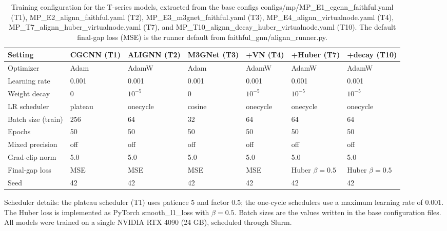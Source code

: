 \documentclass[a4paper,10pt]{article}
\begin{document}
\begin{table}[htbp]
\centering
\caption{Training configuration for the T-series models, extracted from the base configs \textnormal{configs/mp/MP\_\allowbreak E1\_\allowbreak cgcnn\_\allowbreak faithful.yaml} (T1), \textnormal{MP\_\allowbreak E2\_\allowbreak alignn\_\allowbreak faithful.yaml} (T2), \textnormal{MP\_\allowbreak E3\_\allowbreak m3gnet\_\allowbreak faithful.yaml} (T3), \textnormal{MP\_\allowbreak E4\_\allowbreak alignn\_\allowbreak virtualnode.yaml} (T4), \textnormal{MP\_\allowbreak T7\_\allowbreak alignn\_\allowbreak huber\_\allowbreak virtualnode.yaml} (T7), and \textnormal{MP\_\allowbreak T10\_\allowbreak alignn\_\allowbreak decay\_\allowbreak huber\_\allowbreak virtualnode.yaml} (T10). The default final-gap loss (MSE) is the runner default from \textnormal{faithful\_\allowbreak gnn/alignn\_\allowbreak runner.py}.}
\label{tab:train-config}
\scriptsize
\begin{tabular}{l l l l l l l}
\toprule
Setting & CGCNN (T1) & ALIGNN (T2) & M3GNet (T3) & +VN (T4) & +Huber (T7) & +decay (T10) \\
\midrule
Optimizer          & Adam    & AdamW    & Adam   & AdamW    & AdamW    & AdamW \\
Learning rate      & 0.001   & 0.001    & 0.001  & 0.001    & 0.001    & 0.001 \\
Weight decay       & 0       & \(10^{-5}\) & 0   & \(10^{-5}\) & \(10^{-5}\) & \(10^{-5}\) \\
LR scheduler       & plateau & onecycle & cosine & onecycle & onecycle & onecycle \\
Batch size (train) & 256     & 64       & 32     & 64       & 64       & 64 \\
Epochs             & 50      & 50       & 50     & 50       & 50       & 50 \\
Mixed precision    & off     & off      & off    & off      & off      & off \\
Grad-clip norm     & 5.0     & 5.0      & 5.0    & 5.0      & 5.0      & 5.0 \\
Final-gap loss     & MSE     & MSE      & MSE    & MSE      & Huber \(\beta{=}0.5\) & Huber \(\beta{=}0.5\) \\
Seed               & 42      & 42       & 42     & 42       & 42       & 42 \\
\bottomrule
\end{tabular}
\end{table}

Scheduler details: the plateau scheduler (T1) uses patience 5 and factor 0.5; the one-cycle schedulers use a maximum learning rate of 0.001. The Huber loss is implemented as PyTorch \textnormal{smooth\_l1\_loss} with \(\beta=0.5\). Batch sizes are the values written in the base configuration files. All models were trained on a single NVIDIA RTX 4090 (24 GB), scheduled through Slurm.
\end{document}
